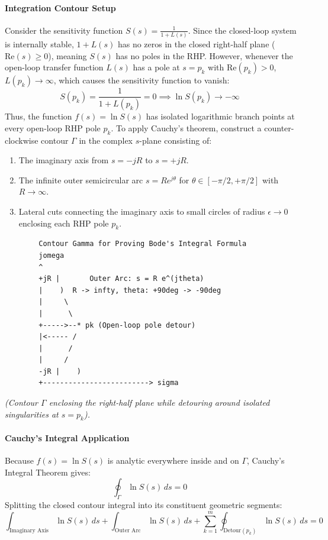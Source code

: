 \documentclass[12pt,onecolumn,twoside ]{article}
\begin{document}
	\paragraph{Integration Contour Setup}
	Consider the sensitivity function $S(s) = \frac{1}{1 + L(s)}$. Since the closed-loop system is internally stable, $1 + L(s)$ has no zeros in the closed right-half plane ($\text{Re}(s) \ge 0$), meaning $S(s)$ has no poles in the RHP. However, whenever the open-loop transfer function $L(s)$ has a pole at $s = p_k$ with $\text{Re}(p_k) > 0$, $L(p_k) \to \infty$, which causes the sensitivity function to vanish: \[
	S(p_k) = \frac{1}{1 + L(p_k)} = 0 \implies \ln S(p_k) \to -\infty \quad
	\]
	Thus, the function $f(s) = \ln S(s)$ has isolated logarithmic branch points at every open-loop RHP pole $p_k$. To apply Cauchy's theorem, construct a counter-clockwise contour $\Gamma$ in the complex $s$-plane consisting of:
	\begin{enumerate}
		\item
		The imaginary axis from $s = -jR$ to $s = +jR$.
		\item
		The infinite outer semicircular arc $s = R e^{j\theta}$ for $\theta \in [-\pi/2, +\pi/2]$ with $R \to \infty$.
		\item
		Lateral cuts connecting the imaginary axis to small circles of radius $\epsilon \to 0$ enclosing each RHP pole $p_k$.
	\end{enumerate}
	\begin{lstlisting}
		Contour Gamma for Proving Bode's Integral Formula
		jomega
		^
		+jR |       Outer Arc: s = R e^(jtheta)
		|    )  R -> infty, theta: +90deg -> -90deg
		|     \
		|      \
		+----->--* pk (Open-loop pole detour)
		|<----- /
		|      /
		|     /
		-jR |    )
		+-------------------------> sigma
	\end{lstlisting}
	\textit{(Contour $\Gamma$ enclosing the right-half plane while detouring around isolated singularities at $s = p_k$).}
	\paragraph{Cauchy’s Integral Application}
	Because $f(s) = \ln S(s)$ is analytic everywhere inside and on $\Gamma$, Cauchy's Integral Theorem gives: \[
	\oint_{\Gamma} \ln S(s)\, ds = 0 \quad
	\]
	Splitting the closed contour integral into its constituent geometric segments: \[
	\int_{\text{Imaginary Axis}} \ln S(s)\, ds + \int_{\text{Outer Arc}} \ln S(s)\, ds + \sum_{k=1}^m \oint_{\text{Detour}(p_k)} \ln S(s)\, ds = 0 \quad
	\]
\end{document}
